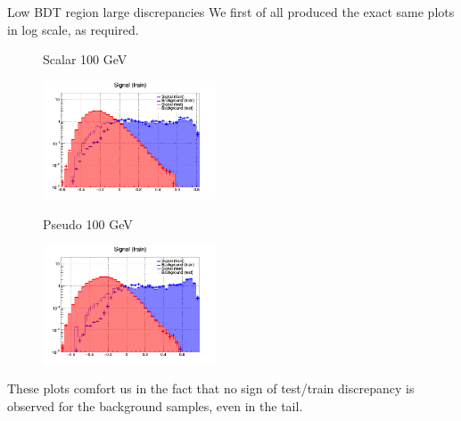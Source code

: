 \documentclass[8pt]{beamer}
\begin{document}
\begin{frame}{Low BDT region large discrepancies}
\justifying
We first of all produced the exact same plots in log scale, as required. \vfill

\begin{figure}[htbp]
\centering
\begin{minipage}[b]{.49\textwidth}
\vspace{-5pt}
\begin{block}{\centering Scalar 100 GeV}\end{block}
\begin{center}
\includegraphics[width=5.2cm, height=3.5cm]{figs/log_scalar_overtraining_100GeV_TTbar.png}
\end{center}
\end{minipage}
\begin{minipage}[b]{.02\textwidth}\end{minipage}
\begin{minipage}[b]{.49\textwidth}
\vspace{-5pt}
\begin{block}{\centering Pseudo 100 GeV}\end{block}
\begin{center}
\includegraphics[width=5.2cm, height=3.5cm]{figs/log_pseudo_overtraining_100GeV_TTbar.png}
\end{center}
\end{minipage}
\end{figure}

These plots comfort us in the fact that no sign of test/train discrepancy is observed for the background samples, even in the tail. \vfill
\end{frame}
\end{document}

